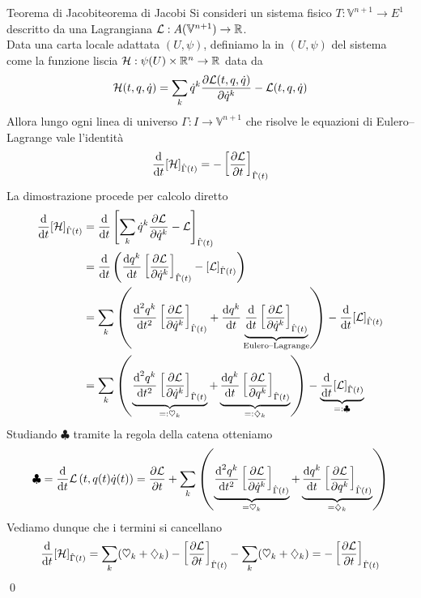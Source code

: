 \documentclass[openany]{book}
\renewcommand\V{\mathbb{V}}
\begin{document}
\begin{theorem}{Teorema di Jacobi}{teorema di Jacobi}
    Si consideri un sistema fisico $T:\V^{n+1}\to E^1$ descritto da una Lagrangiana $\L : A(\V^{n+1})\to\R$.\\
    Data una carta locale adattata $(U,\psi)$, definiamo la  in $(U,\psi)$ del sistema come la funzione liscia $\mathcal{H} : \psi(U)\times\mathbb{R}^n\to \mathbb{R}$ data da 
    \[ \mathcal{H}(t,q,\dot q) = \sum_k \dot q^k\frac{\partial \mathcal{L}(t,q,\dot q)}{\partial \dot q^k} - \mathcal{L}(t,q,\dot q) \]
    Allora lungo ogni linea di universo $\Gamma:I\to\V^{n+1}$ che risolve le equazioni di Eulero--Lagrange vale l'identità 
    \[ \frac{\text{d}}{\text{d} t} [\mathcal{H}]_{\hat\Gamma(t)} = -\left[ \frac{\partial \mathcal{L}}{\partial t} \right]_{\hat\Gamma(t)} \]
    \proof 
    La dimostrazione procede per calcolo diretto 
    \begin{align*}
        \frac{\text{d}}{\text{d} t}[\mathcal{H}]_{\hat\Gamma(t)} & = \frac{\text{d}}{\text{d} t}\left[ \sum_k \dot q^k \frac{\partial \mathcal{L}}{\partial \dot q^k} - \mathcal{L} \right]_{\hat\Gamma(t)} \\
        & = \frac{\text{d}}{\text{d} t}\left( \frac{\text{d} q^k}{\text{d} t}\left[ \frac{\partial \mathcal{L}}{\partial \dot q^k} \right]_{\hat\Gamma(t)} - [\mathcal{L}]_{\hat\Gamma(t)}  \right) \\ 
        & = \sum_k \left( \frac{\text{d}^2 q^k}{\text{d} t^2}\left[ \frac{\partial \mathcal{L}}{\partial \dot q^k} \right]_{\hat\Gamma(t)} + \frac{\text{d} q^k}{\text{d} t} \underbrace{\frac{\text{d}}{\text{d} t}\left[ \frac{\partial \mathcal{L}}{\partial \dot q^k} \right]_{\hat\Gamma(t)}}_{\text{Eulero--Lagrange}} \right) - \frac{\text{d}}{\text{d} t}[\mathcal{L}]_{\hat\Gamma(t)} \\ 
        & = \sum_k\left( \underbrace{\frac{\text{d}^2 q^k}{\text{d} t^2}\left[ \frac{\partial \mathcal{L}}{\partial \dot q^k} \right]_{\hat\Gamma(t)}}_{=:\heartsuit_k } + \underbrace{\frac{\text{d} q^k}{\text{d} t} \left[ \frac{\partial \mathcal{L}}{\partial q^k} \right]_{\hat\Gamma(t)}}_{=:\diamondsuit_k} \right) - \underbrace{\frac{\text{d}}{\text{d} t}[\mathcal{L}]_{\hat\Gamma(t)}}_{=:\clubsuit}
    \end{align*}
    Studiando $\clubsuit$ tramite la regola della catena otteniamo 
    \[ \clubsuit = \frac{\text{d}}{\text{d} t}\mathcal{L}\left(t,q(t)\dot q(t)\right) = \frac{\partial \mathcal{L}}{\partial t} + \sum_k\left( \underbrace{\frac{\text{d}^2 q^k}{\text{d} t^2}\left[ \frac{\partial \mathcal{L}}{\partial \dot q^k} \right]_{\hat\Gamma(t)}}_{=\heartsuit_k } + \underbrace{\frac{\text{d} q^k}{\text{d} t} \left[ \frac{\partial \mathcal{L}}{\partial q^k} \right]_{\hat\Gamma(t)}}_{=\diamondsuit_k} \right) \]
    Vediamo dunque che i termini si cancellano
    \[ \frac{\text{d}  }{\text{d} t}[\mathcal{H}]_{\hat\Gamma(t)} = \sum_k (\heartsuit_k + \diamondsuit_k) -\left[ \frac{\partial \mathcal{L}}{\partial t} \right]_{\hat\Gamma(t)} -\sum_k(\heartsuit_k + \diamondsuit_k) = -\left[ \frac{\partial \mathcal{L}}{\partial t} \right]_{\hat\Gamma(t)} \]
    \qed
\end{theorem}
\end{document}
